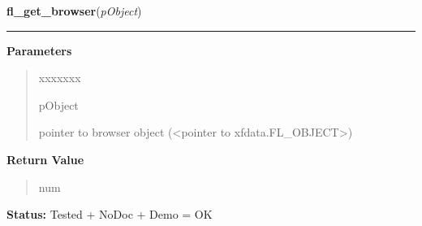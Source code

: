 \hspace{.8\funcindent}\begin{boxedminipage}{\funcwidth}

    \raggedright \textbf{fl\_get\_browser}(\textit{pObject})

    \vspace{-1.5ex}

    \rule{\textwidth}{0.5\fboxrule}
\setlength{\parskip}{2ex}
\setlength{\parskip}{1ex}
      \textbf{Parameters}
      \vspace{-1ex}

      \begin{quote}
        \begin{Ventry}{xxxxxxx}

          \item[pObject]

          pointer to browser object ({\textless}pointer to 
          xfdata.FL\_OBJECT{\textgreater})

        \end{Ventry}

      \end{quote}

      \textbf{Return Value}
    \vspace{-1ex}

      \begin{quote}
      num

      \end{quote}

\textbf{Status:} Tested + NoDoc + Demo = OK



    \end{boxedminipage}

    \label{xformslib:library:fl_get_browser_maxline}

    \vspace{0.5ex}

